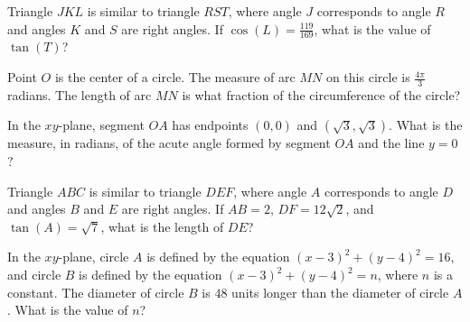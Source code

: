 \noindent\markforreview
\vspace{1em}

Triangle $JKL$ is similar to triangle $RST$, where angle $J$ corresponds to angle $R$ and angles $K$ and $S$ are right angles. If $\cos(L) = \frac{119}{169}$, what is the value of $\tan(T)$?


\vspace{2em}

\noindent\markforreview
\vspace{1em}

Point $O$ is the center of a circle. The measure of arc $MN$ on this circle is $\frac{4\pi}{3}$ radians. The length of arc $MN$ is what fraction of the circumference of the circle?

\vspace{2em}

\noindent\markforreview
\vspace{1em}

In the $xy$-plane, segment $OA$ has endpoints $(0,0)$ and $(\sqrt{3}, \sqrt{3})$. What is the measure, in radians, of the acute angle formed by segment $OA$ and the line $y = 0$?


\vspace{2em}

\noindent\markforreview
\vspace{1em}

Triangle $ABC$ is similar to triangle $DEF$, where angle $A$ corresponds to angle $D$ and angles $B$ and $E$ are right angles. If $AB = 2$, $DF = 12\sqrt{2}$, and $\tan(A) = \sqrt{7}$, what is the length of $DE$?

\vspace{2em}

\noindent\markforreview
\vspace{1em}

In the $xy$-plane, circle $A$ is defined by the equation $(x - 3)^2 + (y - 4)^2 = 16$, and circle $B$ is defined by the equation $(x - 3)^2 + (y - 4)^2 = n$, where $n$ is a constant. The diameter of circle $B$ is $48$ units longer than the diameter of circle $A$. What is the value of $n$?

\vspace{2em}

